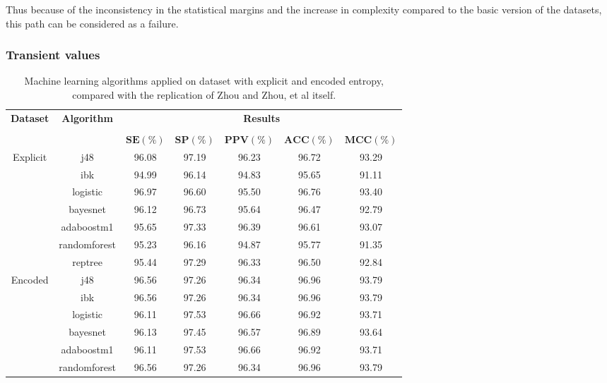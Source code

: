 Thus because of the inconsistency in the statistical margins and the increase in complexity compared to the basic version of the datasets, this path can be considered as a failure.

\subsubsection{Transient values}
\label{table:zhou_hr_and_unimol}

\begin{table}[h]
\begin{center}
\begin{threeparttable}
\caption[State of the art algorithm replication performance.]{Machine learning algorithms applied on dataset with explicit and encoded entropy, compared with the replication of Zhou and Zhou, et al \cite{zhou2015} itself.}
\label{table:zhou_hr_and_unimol}
\scriptsize
  \begin{tabular}{c c c c c c c}
  \toprule
  \textbf{Dataset} & \textbf{Algorithm} & \multicolumn{5}{c}{\textbf{Results}} \\
  \cline{3-7}
  \\
  & & $\mathbf{SE(\%)}$ & $\mathbf{SP(\%)}$ & $\mathbf{PPV(\%)}$ & $\mathbf{ACC(\%)}$ & $\mathbf{MCC(\%)}$\\
  \midrule  
  Explicit & j48 & 96.08 & 97.19 & 96.23 & 96.72 & 93.29 \\
  & ibk & 94.99 & 96.14 & 94.83 & 95.65 & 91.11 \\
  & logistic & 96.97 & 96.60 & 95.50 & 96.76 & 93.40 \\
  & bayesnet & 96.12 & 96.73 & 95.64 & 96.47 & 92.79 \\
  & adaboostm1 & 95.65 & 97.33 & 96.39 & 96.61 & 93.07 \\
  & randomforest & 95.23 & 96.16 & 94.87 & 95.77 & 91.35 \\
  & reptree & 95.44 & 97.29 & 96.33 & 96.50 & 92.84 \\
  \hline
  Encoded & j48 & 96.56 & 97.26 & 96.34 & 96.96 & 93.79 \\
  & ibk & 96.56 & 97.26 & 96.34 & 96.96 & 93.79 \\
  & logistic & 96.11 & 97.53 & 96.66 & 96.92 & 93.71 \\
  & bayesnet & 96.13 & 97.45 & 96.57 & 96.89 & 93.64 \\
  & adaboostm1 & 96.11 & 97.53 & 96.66 & 96.92 & 93.71 \\
  & randomforest & 96.56 & 97.26 & 96.34 & 96.96 & 93.79 \\

\end{tabular}
\end{threeparttable}
\end{center}
\end{table}
